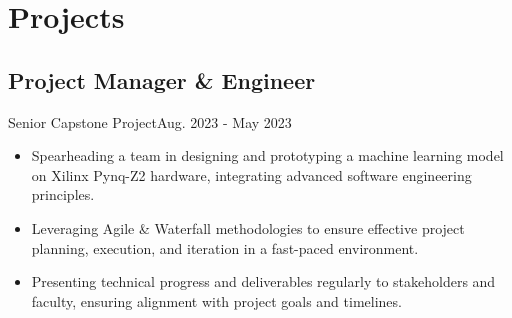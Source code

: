 \section{Projects}
\subsection{Project Manager \& Engineer}{Senior Capstone Project}{Aug. 2023 - May 2023}
\begin{itemize}
    \item Spearheading a team in designing and prototyping a machine learning model on Xilinx Pynq-Z2 hardware, integrating advanced software engineering principles.
    \item Leveraging Agile \& Waterfall methodologies to ensure effective project planning, execution, and iteration in a fast-paced environment.
    \item Presenting technical progress and deliverables regularly to stakeholders and faculty, ensuring alignment with project goals and timelines.
\end{itemize}
